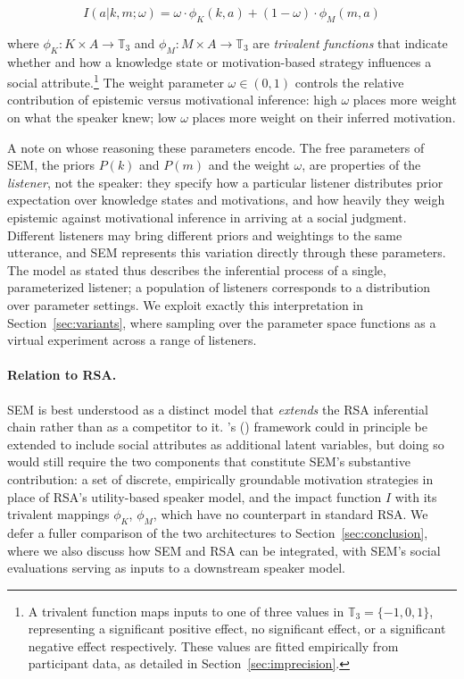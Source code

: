 \documentclass[12pt,a4paper]{article}
\begin{document}
\begin{equation}
I(a|k,m;\omega) = \omega \cdot \phi_K(k,a) + (1-\omega) \cdot \phi_M(m,a)
\label{eq4}
\end{equation}

\noindent where $\phi_K: K \times A \rightarrow \mathbb{T}_3$ and
$\phi_M: M \times A \rightarrow \mathbb{T}_3$ are \emph{trivalent functions}
that indicate whether and how a knowledge state or motivation-based strategy
influences a social attribute.\footnote{A trivalent function maps inputs to one
of three values in $\mathbb{T}_3 = \{-1, 0, 1\}$, representing a significant
positive effect, no significant effect, or a significant negative effect
respectively. These values are fitted empirically from participant data, as
detailed in Section~\ref{sec:imprecision}.} The weight parameter $\omega \in
(0,1)$ controls the relative contribution of epistemic versus motivational
inference: high $\omega$ places more weight on what the speaker knew; low
$\omega$ places more weight on their inferred motivation.

A note on whose reasoning these parameters encode. The free parameters of
SEM, the priors $P(k)$ and $P(m)$ and the weight $\omega$, are properties of
the \emph{listener}, not the speaker: they specify how a particular listener
distributes prior expectation over knowledge states and motivations, and how
heavily they weigh epistemic against motivational inference in arriving at a
social judgment. Different listeners may bring different priors and weightings
to the same utterance, and SEM represents this variation directly through these
parameters. The model as stated thus describes the inferential process of a
single, parameterized listener; a population of listeners corresponds to a
distribution over parameter settings. We exploit exactly this interpretation in
Section~\ref{sec:variants}, where sampling over the parameter space functions as
a virtual experiment across a range of listeners.


\paragraph{Relation to RSA.}
SEM is best understood as a distinct model that \emph{extends} the RSA
inferential chain rather than as a competitor to it. \citeauthor{frank2012}'s
(\citeyear{frank2012}) framework could in principle be extended to include social
attributes as additional latent variables, but doing so would still require the
two components that constitute SEM's substantive contribution: a set of discrete,
empirically groundable motivation strategies in place of RSA's utility-based
speaker model, and the impact function $I$ with its trivalent mappings $\phi_K$,
$\phi_M$, which have no counterpart in standard RSA. We defer a fuller comparison
of the two architectures to Section~\ref{sec:conclusion}, where we also discuss
how SEM and RSA can be integrated, with SEM's social evaluations serving as
inputs to a downstream speaker model.
\end{document}
